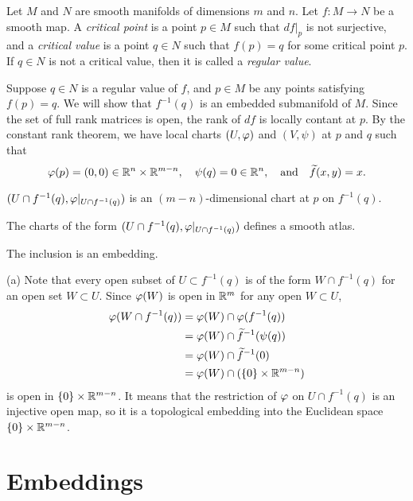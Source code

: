 \documentclass{../../large}
\begin{document}
\begin{prb}
Let $M$ and $N$ are smooth manifolds of dimensions $m$ and $n$.
Let $f:M\to N$ be a smooth map.
A \emph{critical point} is a point $p\in M$ such that $df|_p$ is not surjective, and a \emph{critical value} is a point $q\in N$ such that $f(p)=q$ for some critical point $p$.
If $q\in N$ is not a critical value, then it is called a \emph{regular value}.

Suppose $q\in N$ is a regular value of $f$, and $p\in M$ be any points satisfying $f(p)=q$.
We will show that $f^{-1}(q)$ is an embedded submanifold of $M$.
Since the set of full rank matrices is open, the rank of $df$ is locally contant at $p$.
By the constant rank theorem, we have local charts $(U,\varphi)$ and $(V,\psi)$ at $p$ and $q$ such that
\[\varphi(p)=(0,0)\in\mathbb{R}^n\times\mathbb{R}^{m-n},\quad\psi(q)=0\in\mathbb{R}^n,\quad\text{and}\quad\widetilde f(x,y)=x.\]
\begin{parts}
\item $(U\cap f^{-1}(q),\varphi|_{U\cap f^{-1}(q)})$ is an $(m-n)$-dimensional chart at $p$ on $f^{-1}(q)$.
\item The charts of the form $(U\cap f^{-1}(q),\varphi|_{U\cap f^{-1}(q)})$ defines a smooth atlas.
\item The inclusion is an embedding.
\end{parts}
\end{prb}
\begin{pf}
(a)
Note that every open subset of $U\subset f^{-1}(q)$ is of the form $W\cap f^{-1}(q)$ for an open set $W\subset U$.
Since $\varphi(W)$ is open in $\mathbb{R}^m$ for any open $W\subset U$,
\begin{align*}
\varphi(W\cap f^{-1}(q))
&=\varphi(W)\cap\varphi(f^{-1}(q))\\
&=\varphi(W)\cap\widetilde f^{-1}(\psi(q))\\
&=\varphi(W)\cap\widetilde f^{-1}(0)\\
&=\varphi(W)\cap(\{0\}\times\mathbb{R}^{m-n})
\end{align*}
is open in $\{0\}\times\mathbb{R}^{m-n}$.
It means that the restriction of $\varphi$ on $U\cap f^{-1}(q)$ is an injective open map, so it is a topological embedding into the Euclidean space $\{0\}\times\mathbb{R}^{m-n}$.

\end{pf}


\section{Embeddings}
\end{document}
